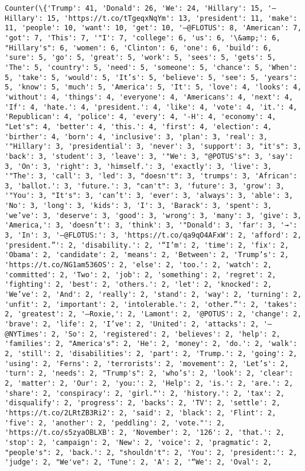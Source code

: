 \documentclass[11pt]{article}
\begin{document}
    \begin{Verbatim}[commandchars=\\\{\}]
Counter(\{'Trump': 41, 'Donald': 26, 'We': 24, 'Hillary': 15, '—Hillary': 15, 'https://t.co/tTgeqxNqYm': 13, 'president': 11, 'make': 11, 'people': 10, 'want': 10, 'get': 10, '—@FLOTUS': 8, 'American': 7, 'got': 7, 'This': 7, '"I': 7, 'college': 6, 'us': 6, '\&amp;': 6, "Hillary's": 6, 'women': 6, 'Clinton': 6, 'one': 6, 'build': 6, 'sure': 5, 'go': 5, 'great': 5, 'work': 5, 'sees': 5, 'gets': 5, 'The': 5, 'country': 5, 'need': 5, 'someone': 5, 'chance': 5, 'When': 5, 'take': 5, 'would': 5, 'It’s': 5, 'believe': 5, 'see': 5, 'years': 5, 'know': 5, 'much': 5, 'America': 5, 'It': 5, 'love': 4, 'looks': 4, 'without': 4, 'things': 4, 'everyone': 4, 'Americans': 4, 'next': 4, 'If': 4, 'hate.': 4, 'president.': 4, 'like': 4, 'vote': 4, 'it.': 4, 'Republican': 4, 'police': 4, 'every': 4, '-H': 4, 'economy': 4, "Let's": 4, 'better': 4, 'this.': 4, 'first': 4, 'election': 4, 'birther': 4, 'born': 4, 'inclusive': 3, 'plan': 3, 'real': 3, '"Hillary': 3, 'presidential': 3, 'never': 3, 'support': 3, "it's": 3, 'back': 3, 'student': 3, 'leave': 3, '"We': 3, "@POTUS's": 3, 'say': 3, 'On': 3, 'right': 3, 'himself.': 3, 'exactly': 3, 'live': 3, '"The': 3, 'call': 3, 'led': 3, "doesn't": 3, 'trumps': 3, 'African': 3, 'ballot.': 3, 'future.': 3, "can't": 3, 'future': 3, 'grow': 3, '"You': 3, "It's": 3, 'can’t': 3, 'ever': 3, 'always': 3, 'able': 3, 'No': 3, 'long': 3, 'kids': 3, 'I': 3, 'Barack': 3, 'spent': 3, 'we’ve': 3, 'deserve': 3, 'good': 3, 'wrong': 3, 'many': 3, 'give': 3, 'America,': 3, 'doesn’t': 3, 'think': 3, '"Donald': 3, 'far': 3, '→': 3, 'In': 3, '—@FLOTUS:': 3, 'https://t.co/qa9qO4AFxW': 2, 'afford': 2, 'president.”': 2, 'disability.': 2, '“I’m': 2, 'time': 2, 'fix': 2, 'Obama': 2, 'candidate': 2, 'means': 2, 'Between': 2, 'Trump’s': 2, 'https://t.co/NG1am536OS': 2, 'else': 2, 'too.': 2, 'watch': 2, 'committed': 2, 'Two': 2, 'job': 2, 'something': 2, 'regret': 2, 'fighting': 2, 'best': 2, 'others.': 2, 'let': 2, 'knocked': 2, 'We’ve': 2, 'And': 2, 'really': 2, 'stand': 2, 'way': 2, 'turning': 2, 'unfit': 2, 'important': 2, 'intolerable.': 2, 'other.”': 2, 'takes': 2, 'greatest': 2, '—Roxie,': 2, 'Lamont': 2, '@POTUS': 2, 'change': 2, 'brave': 2, 'life': 2, 'I’ve': 2, 'United': 2, 'attacks': 2, '—@NYTimes': 2, 'So': 2, 'registered': 2, 'believes': 2, 'help': 2, 'families': 2, "America's": 2, 'He': 2, 'money': 2, 'do.': 2, 'walk': 2, 'still': 2, 'disabilities': 2, 'part': 2, 'Trump.': 2, 'going': 2, 'using': 2, 'Ferns': 2, 'terrorists': 2, 'movement': 2, 'Let’s': 2, 'turn': 2, 'needs': 2, "Trump's": 2, 'who’s': 2, 'look': 2, 'clear': 2, 'matter': 2, 'Our': 2, 'you:': 2, 'Help': 2, 'is.': 2, 'are.': 2, 'share': 2, 'conspiracy': 2, 'girl."': 2, 'history.': 2, 'tax': 2, 'disqualify': 2, 'progress': 2, 'backs': 2, 'TV': 2, 'settle': 2, 'https://t.co/2LRtZB3Ri2': 2, 'said': 2, 'black': 2, 'Flint': 2, 'five': 2, 'another': 2, 'peddling': 2, 'vote."': 2, 'https://t.co/s5zyaOBLXB': 2, 'November': 2, '126': 2, 'that.': 2, 'stop': 2, 'campaign': 2, 'New': 2, 'voice': 2, 'pragmatic': 2, "people's": 2, 'back.': 2, "shouldn't": 2, 'You': 2, 'president:': 2, 'judge': 2, "We've": 2, 'Tune': 2, 'A': 2, '“We': 2, 'Oval': 2, 
\end{Verbatim}
\end{document}

